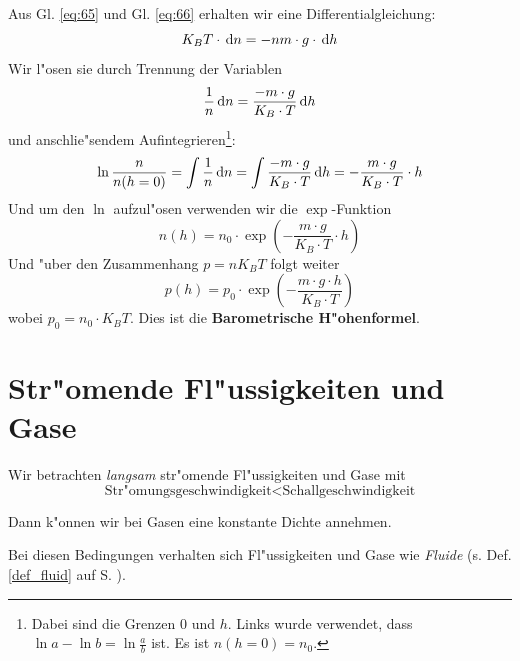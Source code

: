Aus Gl. \eqref{eq:65} und Gl. \eqref{eq:66} erhalten wir eine
Differentialgleichung:
\begin{equation}
   \label{eq:67}
    K_B T \cdot \, \mathrm{d} n   =  -nm \cdot g \cdot
   \, \mathrm{d} h
\end{equation}
Wir l"osen sie durch Trennung der Variablen 
$$
\frac{1}{n} \, \mathrm{d} n = \frac{- m \cdot g}{K_B \cdot T} \, \mathrm{d} h
$$
und anschlie"sendem Aufintegrieren\footnote{%
  Dabei sind die Grenzen $0$ und $h$. Links wurde verwendet, dass $\ln
  a - \ln b = \ln \frac{a}{b}$ ist. Es ist $n(h = 0) = n_0$.}:
$$
\ln \frac n {n(h = 0)} = \int \frac{1}{n} \, \mathrm{d} n = \int \frac{- m \cdot g}{K_B \cdot
  T} \, \mathrm{d} h = -\frac{ m \cdot g }{K_B \cdot T}\cdot h
$$
Und um den $\ln$ aufzul"osen verwenden wir die $\exp$-Funktion
\begin{equation}
   \label{eq:68}
n(h) = n_0 \cdot \exp \left ( -\frac{m \cdot g }{K_B \cdot T}\cdot h \right )  
\end{equation}
Und "uber den Zusammenhang $p = n K_B T$ folgt weiter
\begin{equation}
   \label{eq:69}
\boxed{   p(h) = {p_0} \cdot  \exp \left ( -\frac{m \cdot g \cdot h}{K_B \cdot T} \right )  }
\end{equation}
wobei $p_0 = n_0 \cdot K_B T$. Dies ist die
\textbf{Barometrische H"ohenformel}.









\section{Str"omende Fl"ussigkeiten und Gase}
\label{kap_stromende-flussigkeiten-und-gase}


\begin{Wichtig}
   Wir betrachten \emph{langsam} str"omende Fl"ussigkeiten und Gase mit 
$$
\text{Str"omungsgeschwindigkeit} < \text{Schallgeschwindigkeit}
$$
\end{Wichtig}
Dann k"onnen wir bei Gasen eine konstante Dichte annehmen.

Bei diesen Bedingungen verhalten sich Fl"ussigkeiten und Gase wie
\emph{Fluide} (s. Def. \ref{def_fluid} auf S. \pageref{def_fluid}).

